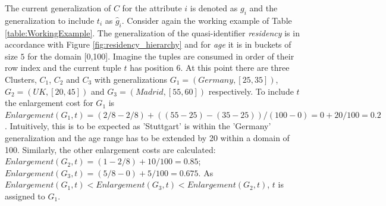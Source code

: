 The current generalization of $C$ for the attribute $i$ is denoted as $g_i$ and the generalization to include $t_i$ as $\hat{g}_i$. Consider again the working example of Table \ref{table:WorkingExample}. The generalization of the quasi-identifier \textit{residency} is in accordance with Figure \ref{fig:residency_hierarchy} and for \textit{age} it is in buckets of size $5$ for the domain [0,100]. Imagine the tuples are consumed in order of their row index and the current tuple $t$ has position 6. At this point there are three Clusters, $C_1$, $C_2$ and $C_3$ with generalizations $G_1 = (Germany, [25,35])$, $G_2 = (UK, [20,45])$ and $G_3 = (Madrid,[55,60])$ respectively. To include $t$ the enlargement cost for $G_1$ is $Enlargement(G_1, t) = (2/8 - 2/8) + ((55-25) - (35-25))/ (100 - 0) = 0 + 20/100 = 0.2$. Intuitively,  this is to be expected as 'Stuttgart' is within the 'Germany' generalization and the age range has to be extended by 20 within a domain of 100. Similarly, the other enlargement costs are calculated: $Enlargement(G_2, t) = (1 - 2/8) + 10/100 = 0.85$; $Enlargement(G_3, t) = (5/8 - 0) + 5/100 = 0.675$. As $Enlargement(G_1, t) < Enlargement(G_3, t) < Enlargement(G_2, t)$, $t$ is assigned to $G_1$. \par

